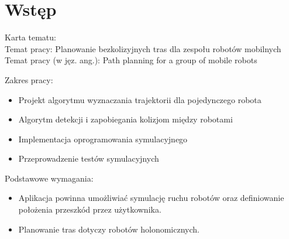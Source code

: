 \chapter{Wstęp}
\label{ch:wstep}

Karta tematu: \\
Temat pracy: Planowanie bezkolizyjnych tras dla zespołu robotów mobilnych \\
Temat pracy (w jęz. ang.): Path planning for a group of mobile robots

Zakres pracy:
\begin{itemize}
	\item Projekt algorytmu wyznaczania trajektorii dla pojedynczego robota
	\item Algorytm detekcji i zapobiegania kolizjom między robotami
	\item Implementacja oprogramowania symulacyjnego
	\item Przeprowadzenie testów symulacyjnych
\end{itemize}

Podstawowe wymagania:
\begin{itemize}
	\item Aplikacja powinna umożliwiać symulację ruchu robotów oraz definiowanie położenia przeszkód przez użytkownika.
	\item Planowanie tras dotyczy robotów holonomicznych.
\end{itemize}


